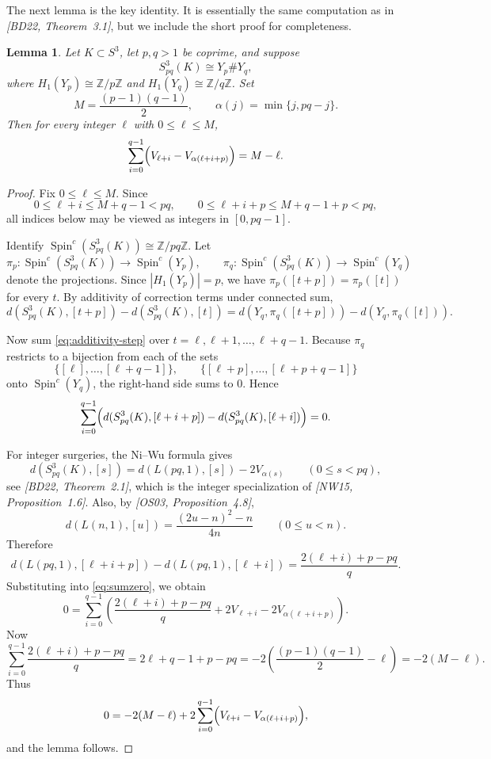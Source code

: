 \documentclass[11pt]{article}
\newtheorem{lemma}[theorem]{Lemma}
\newcommand{\Spinc}{\operatorname{Spin}^{c}}
\begin{document}
The next lemma is the key identity.  It is essentially the same computation as in
\emph{[BD22, Theorem~3.1]}, but we include the short proof for completeness.

\begin{lemma}\label{lem:identity}
Let \(K\subset S^{3}\), let \(p,q>1\) be coprime, and suppose
\[
S^{3}_{pq}(K)\cong Y_{p}\# Y_{q},
\]
where \(H_{1}(Y_{p})\cong \mathbb{Z}/p\mathbb{Z}\) and
\(H_{1}(Y_{q})\cong \mathbb{Z}/q\mathbb{Z}\).
Set
\[
M=\frac{(p-1)(q-1)}{2},
\qquad
\alpha(j)=\min\{j,pq-j\}.
\]
Then for every integer \(\ell\) with \(0\le \ell\le M\),
\[
\sum_{i=0}^{q-1}\Bigl(V_{\ell+i}-V_{\alpha(\ell+i+p)}\Bigr)=M-\ell.
\]
\end{lemma}

\begin{proof}
Fix \(0\le \ell\le M\).
Since
\[
0\le \ell+i \le M+q-1 < pq,
\qquad
0\le \ell+i+p \le M+q-1+p < pq,
\]
all indices below may be viewed as integers in \([0,pq-1]\).

Identify \(\Spinc\!\left(S^{3}_{pq}(K)\right)\cong \mathbb{Z}/pq\mathbb{Z}\).
Let
\[
\pi_{p}:\Spinc\!\left(S^{3}_{pq}(K)\right)\to \Spinc(Y_{p}),
\qquad
\pi_{q}:\Spinc\!\left(S^{3}_{pq}(K)\right)\to \Spinc(Y_{q})
\]
denote the projections.
Since \(|H_{1}(Y_{p})|=p\), we have \(\pi_{p}([t+p])=\pi_{p}([t])\) for every \(t\).
By additivity of correction terms under connected sum,
\begin{equation}\label{eq:additivity-step}
d\!\left(S^{3}_{pq}(K),[t+p]\right)-d\!\left(S^{3}_{pq}(K),[t]\right)
=
d\!\left(Y_{q},\pi_{q}([t+p])\right)-d\!\left(Y_{q},\pi_{q}([t])\right).
\end{equation}

Now sum \eqref{eq:additivity-step} over \(t=\ell,\ell+1,\dots,\ell+q-1\).
Because \(\pi_{q}\) restricts to a bijection from each of the sets
\[
\{[\ell],\dots,[\ell+q-1]\},
\qquad
\{[\ell+p],\dots,[\ell+p+q-1]\}
\]
onto \(\Spinc(Y_{q})\), the right-hand side sums to \(0\).  Hence
\begin{equation}\label{eq:sumzero}
\sum_{i=0}^{q-1}
\Bigl(
d(S^{3}_{pq}(K),[\ell+i+p])-d(S^{3}_{pq}(K),[\ell+i])
\Bigr)=0.
\end{equation}

For integer surgeries, the Ni--Wu formula gives
\[
d(S^{3}_{pq}(K),[s])=d(L(pq,1),[s])-2V_{\alpha(s)}
\qquad (0\le s<pq),
\]
see \emph{[BD22, Theorem~2.1]}, which is the integer specialization of
\emph{[NW15, Proposition~1.6]}.
Also, by \emph{[OS03, Proposition~4.8]},
\[
d(L(n,1),[u])=\frac{(2u-n)^{2}-n}{4n}\qquad (0\le u<n).
\]
Therefore
\[
d(L(pq,1),[\ell+i+p])-d(L(pq,1),[\ell+i])
=
\frac{2(\ell+i)+p-pq}{q}.
\]
Substituting into \eqref{eq:sumzero}, we obtain
\[
0
=
\sum_{i=0}^{q-1}
\left(
\frac{2(\ell+i)+p-pq}{q}
+
2V_{\ell+i}
-
2V_{\alpha(\ell+i+p)}
\right).
\]
Now
\[
\sum_{i=0}^{q-1}\frac{2(\ell+i)+p-pq}{q}
=
2\ell+q-1+p-pq
=
-2\left(\frac{(p-1)(q-1)}{2}-\ell\right)
=
-2(M-\ell).
\]
Thus
\[
0=-2(M-\ell)+2\sum_{i=0}^{q-1}\Bigl(V_{\ell+i}-V_{\alpha(\ell+i+p)}\Bigr),
\]
and the lemma follows.
\end{proof}
\end{document}
